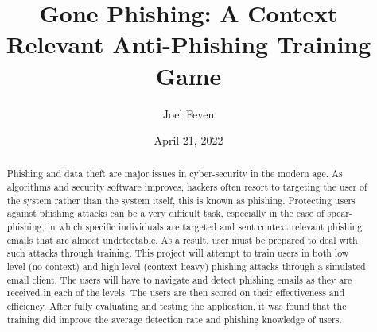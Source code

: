 \documentclass{l4proj}
\begin{document}
\title{Gone Phishing: A Context Relevant Anti-Phishing Training Game }
\author{Joel Feven}
\date{April 21, 2022}

\maketitle

\begin{abstract}

Phishing and data theft are major issues in cyber-security in the modern age. As algorithms and security software improves, hackers often resort to targeting the user of the system rather than the system itself, this is known as phishing. Protecting users against phishing attacks can be a very difficult task, especially in the case of spear-phishing, in which specific individuals are targeted and sent context relevant phishing emails that are almost undetectable. As a result, user must be prepared to deal with such attacks through training. This project will attempt to train users in both low level (no context) and high level (context heavy) phishing attacks through a simulated email client. The users will have to navigate and detect phishing emails as they are received in each of the levels. The users are then scored on their effectiveness and efficiency. After fully evaluating and testing the application, it was found that the training did improve the average detection rate and phishing knowledge of users.

\end{abstract}


%
%
%
\educationalconsent
\end{document}
